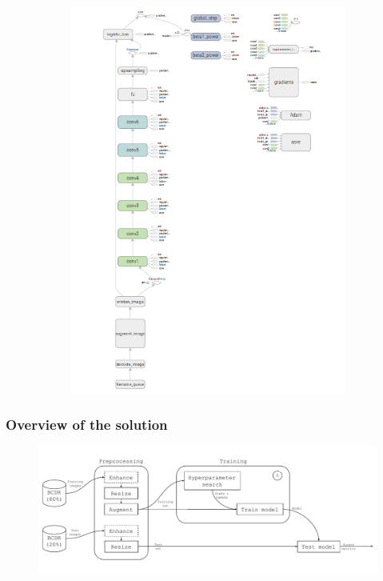 \documentclass{beamer}
\begin{document}
\begin{frame}
\begin{figure}
\begin{subfigure}{0.5\textwidth}
				\includegraphics[width=\textwidth]{plots/tf_graph.png}
			\end{subfigure}
		\end{figure}
	\end{frame}
	
	\begin{frame}
	    \frametitle{Overview of the solution}
		\begin{figure}
			\centering
			\includegraphics[width=\textwidth]{plots/overview.pdf}
		\end{figure}
	\end{frame}
	
\end{document}
